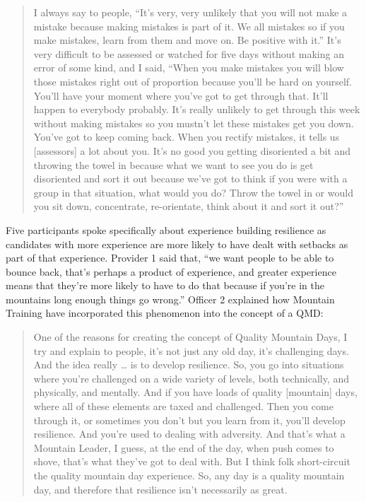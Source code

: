 \documentclass[
  12pt,
  a4paper,
]{book}
\begin{document}
\begin{quote}
I always say to people, ``It's very, very unlikely that you will not make a mistake because making mistakes is part of it. We all mistakes so if you make mistakes, learn from them and move on. Be positive with it.'' It's very difficult to be assessed or watched for five days without making an error of some kind, and I said, ``When you make mistakes you will blow those mistakes right out of proportion because you'll be hard on yourself. You'll have your moment where you've got to get through that. It'll happen to everybody probably. It's really unlikely to get through this week without making mistakes so you mustn't let these mistakes get you down. You've got to keep coming back. When you rectify mistakes, it tells us {[}assessors{]} a lot about you. It's no good you getting disoriented a bit and throwing the towel in because what we want to see you do is get disoriented and sort it out because we've got to think if you were with a group in that situation, what would you do? Throw the towel in or would you sit down, concentrate, re-orientate, think about it and sort it out?''
\end{quote}

Five participants spoke specifically about experience building resilience as candidates with more experience are more likely to have dealt with setbacks as part of that experience. Provider 1 said that, ``we want people to be able to bounce back, that's perhaps a product of experience, and greater experience means that they're more likely to have to do that because if you're in the mountains long enough things go wrong.'' Officer 2 explained how Mountain Training have incorporated this phenomenon into the concept of a QMD:

\begin{quote}
One of the reasons for creating the concept of Quality Mountain Days, I try and explain to people, it's not just any old day, it's challenging days. And the idea really \ldots{} is to develop resilience. So, you go into situations where you're challenged on a wide variety of levels, both technically, and physically, and mentally. And if you have loads of quality {[}mountain{]} days, where all of these elements are taxed and challenged. Then you come through it, or sometimes you don't but you learn from it, you'll develop resilience. And you're used to dealing with adversity. And that's what a Mountain Leader, I guess, at the end of the day, when push comes to shove, that's what they've got to deal with. But I think folk short-circuit the quality mountain day experience. So, any day is a quality mountain day, and therefore that resilience isn't necessarily as great.
\end{quote}
\end{document}
